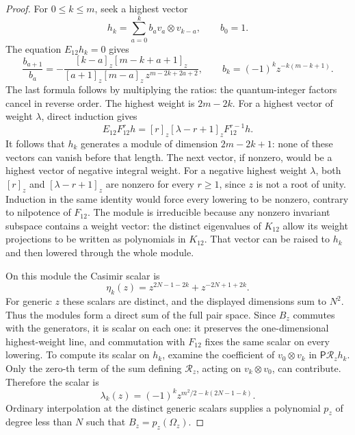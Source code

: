 \documentclass[11pt]{article}
\numberwithin{equation}{section}
\theoremstyle{definition}\newtheorem{definition}[theorem]{Definition}
\theoremstyle{remark}\newtheorem{remark}[theorem]{Remark}
\begin{document}
\begin{proof}
For $0\le k\le m$, seek a highest vector
\[
 h_k=\sum_{a=0}^{k}b_a v_a\otimes v_{k-a},\qquad b_0=1.
\]
The equation $E_{12}h_k=0$ gives
\[
 \frac{b_{a+1}}{b_a}
 =-\frac{[k-a]_z[m-k+a+1]_z}
 {[a+1]_z[m-a]_z\,z^{m-2k+2a+2}},
 \qquad b_k=(-1)^kz^{-k(m-k+1)}.
\]
The last formula follows by multiplying the ratios: the quantum-integer
factors cancel in reverse order. The highest weight is $2m-2k$.
For a highest vector of weight $\lambda$, direct induction gives
\[
 E_{12}F_{12}^{r}h=[r]_z[\lambda-r+1]_zF_{12}^{r-1}h.
\]
It follows that $h_k$ generates a module of dimension $2m-2k+1$:
none of these vectors can vanish before that length. The next vector,
if nonzero, would be a highest vector of negative integral weight.
For a negative highest weight $\lambda$, both $[r]_z$ and
$[\lambda-r+1]_z$ are nonzero for every $r\ge1$, since $z$ is
not a root of unity. Induction in the same identity would force every
lowering to be nonzero, contrary to nilpotence of $F_{12}$. The
module is irreducible because any nonzero invariant subspace contains
a weight vector: the distinct eigenvalues of $K_{12}$ allow its
weight projections to be written as polynomials in $K_{12}$. That vector
can be raised to $h_k$ and then lowered through the whole module.

On this module the Casimir scalar is
\[
 \eta_k(z)=z^{2N-1-2k}+z^{-2N+1+2k}.
\]
For generic $z$ these scalars are distinct, and the displayed dimensions
sum to $N^2$. Thus the modules form a direct sum of the full pair
space. Since $B_z$ commutes with the generators, it is scalar on each
one: it preserves the one-dimensional highest-weight line, and
commutation with $F_{12}$ fixes the same scalar on every lowering.
To compute its scalar on $h_k$, examine the coefficient of
$v_0\otimes v_k$ in $\mathsf P\mathscr R_zh_k$. Only the zero-th
term of the sum defining $\mathscr R_z$, acting on $v_k\otimes v_0$,
can contribute. Therefore the scalar is
\[
 \lambda_k(z)=(-1)^kz^{m^2/2-k(2N-1-k)}.
\]
Ordinary interpolation at the distinct generic scalars supplies a
polynomial $p_z$ of degree less than $N$ such that
$B_z=p_z(\Omega_z)$.


\end{proof}
\end{document}
